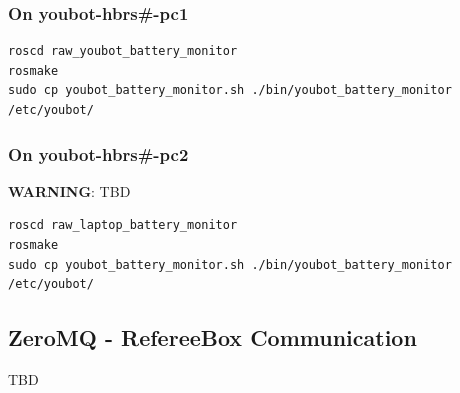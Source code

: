 \documentclass[a4paper,12pt]{article}
\begin{document}
\subsubsection{On youbot-hbrs\#-pc1}
\begin{lstlisting}
roscd raw_youbot_battery_monitor
rosmake
sudo cp youbot_battery_monitor.sh ./bin/youbot_battery_monitor /etc/youbot/
\end{lstlisting}


\subsubsection{On youbot-hbrs\#-pc2}
\textbf{WARNING}: TBD
\begin{lstlisting}
roscd raw_laptop_battery_monitor
rosmake
sudo cp youbot_battery_monitor.sh ./bin/youbot_battery_monitor /etc/youbot/
\end{lstlisting}


\subsection{ZeroMQ - RefereeBox Communication}
TBD
\end{document}
